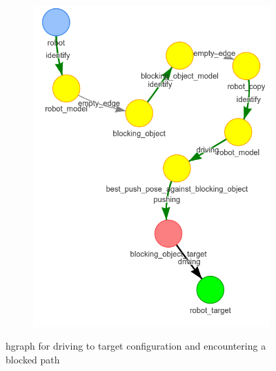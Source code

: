 \begin{figure}[H]
\begin{subfigure}{.3\textwidth}
    \caption{}\label{subfig:blocking_obj_5}
    \end{subfigure}
    \begin{subfigure}{.3\textwidth}
    \centering
    \includegraphics[width=\textwidth]{figures/proposed_method/connecting_nodes/blocking_obj/blocking_obj_6}
    \caption{}\label{subfig:blocking_obj_6}
    \end{subfigure}
    \caption{\ac{hgraph} for driving to target configuration and encountering a blocked path}%
    \label{fig:blocking_obj_hgraph}
\end{figure}

